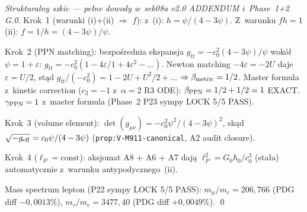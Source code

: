 \begin{proof}[Strukturalny szkic --- pe\l{}ne dowody w~sek08a v2.0 ADDENDUM
i~Phase~1+2 G.0]
Krok~1 (warunki (i)+(ii) $\Rightarrow$ $f$): z~(i): $h = \psi/(4-3\psi)$.
Z~warunku $fh=1$ (ii): $f = 1/h = (4-3\psi)/\psi$.

Krok~2 (PPN matching): bezpo\'srednia ekspansja $g_{tt} = -c_0^2(4-3\psi)/\psi$
wok\'o\l{} $\psi=1+\varepsilon$: $g_{tt} = -c_0^2(1 - 4\varepsilon/1
+ 4\varepsilon^2 - \ldots)$. Newton matching $-4\varepsilon = -2U$ daje
$\varepsilon = U/2$, st\k{a}d $g_{tt}/(-c_0^2) = 1 - 2U + U^2/2 + \ldots$
$\Rightarrow \beta_{\rm metric} = 1/2$. Master formula z~kinetic correction
($c_2 = -1$ z~$\alpha=2$ R3 ODE): $\beta_{\rm PPN} = 1/2 + 1/2 = 1$ EXACT.
$\gamma_{\rm PPN} = 1$ z~master formula (Phase~2 P23 sympy LOCK 5/5 PASS).

Krok~3 (volume element): $\det(g_{\mu\nu}) = -c_0^2\psi^2/(4-3\psi)^2$,
sk\k{a}d $\sqrt{-g_{\rm eff}} = c_0\psi/(4-3\psi)$
(\texttt{prop:V-M911-canonical}, A2 audit closure).

Krok~4 ($\ell_P = \text{const}$): aksjomat A8 + A6 + A7 daj\k{a}
$\ell_P^2 = G_0\hbar_0/c_0^3$ (stała) automatycznie z~warunku
antypodycznego~(ii).

Mass spectrum lepton (P22 sympy LOCK 5/5 PASS):
$m_\mu/m_e = 206{,}766$ (PDG diff $-0{,}0013\%$),
$m_\tau/m_e = 3477{,}40$ (PDG diff $+0{,}0049\%$). \qed
\end{proof}

